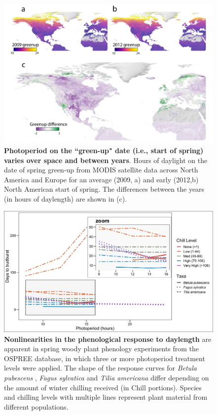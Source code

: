 \documentclass{article}
\begin{document}
 \begin{figure}[p]
\centering
\includegraphics{..//..//docs/photoperiod/figures/Greenup_corr.pdf} %
\caption{\textbf{Photoperiod on the ``green-up" date (i.e., start of spring) varies over space and between years}. Hours of daylight on the date of spring green-up from MODIS satellite data across North America and Europe for an average (2009, a) and  early (2012,b) North American start of spring. The differences between the years (in hours of daylength) are shown in (c). }
 \label{fig:greenup}%
 \end{figure}
 
\begin{figure}[p]
\includegraphics{..//..//analyses/photoperiod/figures/Photo_curv_FINAL.jpeg} 
\caption{\textbf{Nonlinearities in the phenological response to daylength} are apparent in spring woody plant phenology experiments from the OSPREE database, in which three or more photoperiod treatment levels were applied. The shape of the response curves for \textit{Betula pubescens} \citep{Caffarra:2011b}, \textit{Fagus sylvatica} \citep{Heide:1993a} and \textit{Tilia americana} \citep{Ashby:1962aa} differ depending on the amount of winter chilling received (in Chill portions). Species and chilling levels with multiple lines represent plant material from different populations.}
 \label{fig:photocurve}
 \end{figure}
\end{document}
